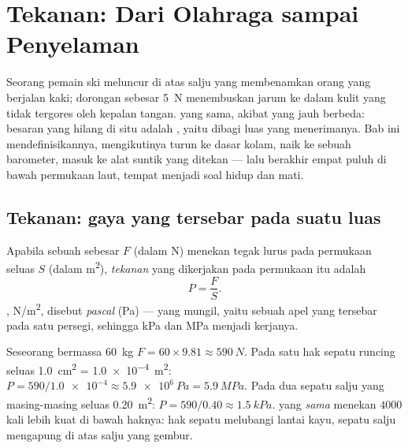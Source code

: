 \chapter{Tekanan: Dari Olahraga sampai Penyelaman}\label{ch:g10:pressure}

Seorang pemain ski meluncur di atas salju yang membenamkan orang yang
berjalan kaki; dorongan sebesar \qty{5}{N} menembuskan jarum ke dalam
kulit yang tidak tergores oleh kepalan tangan.  yang sama, akibat
yang jauh berbeda: besaran yang hilang di situ adalah \emph{},
yaitu  dibagi luas yang menerimanya. Bab ini mendefinisikannya,
mengikutinya turun ke dasar kolam, naik ke sebuah barometer, masuk ke
alat suntik yang ditekan --- lalu berakhir empat puluh  di bawah
permukaan laut, tempat  menjadi soal hidup dan mati.

\section{Tekanan: gaya yang tersebar pada suatu luas}

\begin{definition}[Tekanan]\label{def:g10:pressure:pressure}
Apabila sebuah  sebesar $F$ (dalam \unit{N}) menekan tegak lurus
pada permukaan seluas $S$ (dalam \unit{m^2}), \emph{tekanan}
yang dikerjakan pada permukaan itu adalah
\[
P = \frac{F}{S}.
\]
, \unit{N/m^2}, disebut \emph{pascal}
(\unit{Pa}) ---  yang mungil, yaitu  sebuah apel yang
tersebar pada satu  persegi, sehingga \unit{kPa} dan \unit{MPa}
menjadi  kerjanya.
\end{definition}

\begin{example}\label{ex:g10:pressure:snowshoe}
Seseorang bermassa \qty{60}{kg} 
$F = 60 \times 9.81 \approx \qty{590}{N}$. Pada satu hak sepatu runcing
seluas \qty{1.0}{cm^2} = \qty{1.0e-4}{m^2}:
$P = 590/\num{1.0e-4} \approx \qty{5.9e6}{Pa} = \qty{5.9}{MPa}$. Pada
dua sepatu salju yang masing-masing seluas \qty{0.20}{m^2}:
$P = 590/0.40 \approx \qty{1.5}{kPa}$.  yang \emph{sama} menekan
$4000$ kali lebih kuat di bawah haknya: hak sepatu melubangi lantai
kayu, sepatu salju mengapung di atas salju yang gembur.
\end{example}

